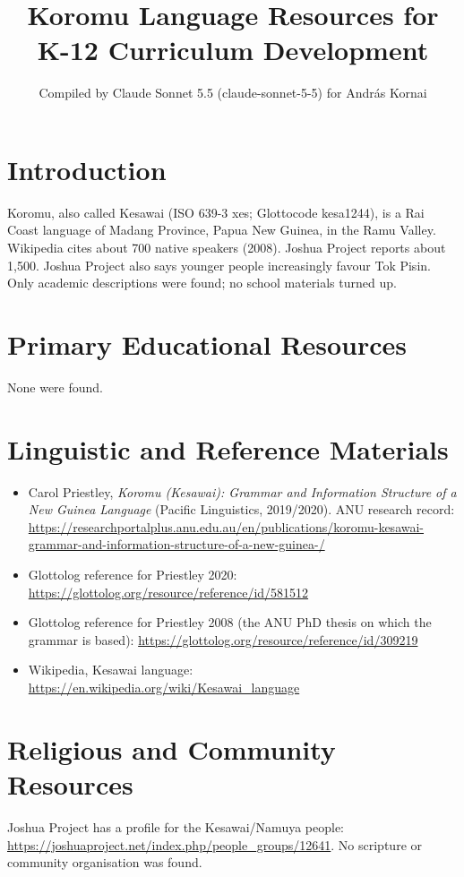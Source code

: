 \documentclass[12pt]{article}
\title{Koromu Language Resources for K-12 Curriculum Development}
\author{Compiled by Claude Sonnet 5.5 (claude-sonnet-5-5) for Andr\'as Kornai}
\date{}
\begin{document}
\maketitle

\section{Introduction}
Koromu, also called Kesawai (ISO 639-3 xes; Glottocode kesa1244), is a Rai Coast language of Madang Province, Papua New Guinea, in the Ramu Valley. Wikipedia cites about 700 native speakers (2008). Joshua Project reports about 1,500. Joshua Project also says younger people increasingly favour Tok Pisin. Only academic descriptions were found; no school materials turned up.

\section{Primary Educational Resources}
None were found.

\section{Linguistic and Reference Materials}
\begin{itemize}
\item Carol Priestley, \emph{Koromu (Kesawai): Grammar and Information Structure of a New Guinea Language} (Pacific Linguistics, 2019/2020). ANU research record: \url{https://researchportalplus.anu.edu.au/en/publications/koromu-kesawai-grammar-and-information-structure-of-a-new-guinea-/}
\item Glottolog reference for Priestley 2020: \url{https://glottolog.org/resource/reference/id/581512}
\item Glottolog reference for Priestley 2008 (the ANU PhD thesis on which the grammar is based): \url{https://glottolog.org/resource/reference/id/309219}
\item Wikipedia, Kesawai language: \url{https://en.wikipedia.org/wiki/Kesawai_language}
\end{itemize}

\section{Religious and Community Resources}
Joshua Project has a profile for the Kesawai/Namuya people: \url{https://joshuaproject.net/index.php/people_groups/12641}. No scripture or community organisation was found.
\end{document}
